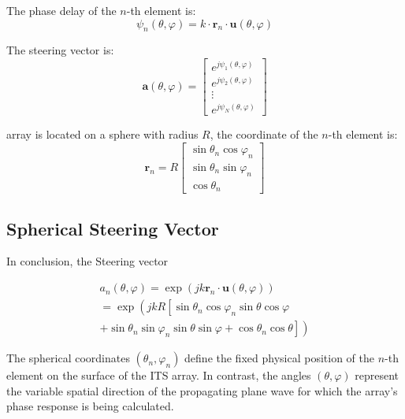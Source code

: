 \documentclass[journal,comsoc]{IEEEtran}
\begin{document}
	The phase delay of the $ n $-th element is:
	\begin{equation}
		\psi_n(\theta, \varphi) = k\cdot \mathbf{r}_n \cdot \mathbf{u}(\theta, \varphi)
	\end{equation}
	
	The steering vector is:
	\begin{equation}
		\mathbf{a}(\theta, \varphi) = \begin{bmatrix} 
			e^{j\psi_1(\theta, \varphi)} \\ 
			e^{j\psi_2(\theta, \varphi)} \\ 
			\vdots \\ 
			e^{j\psi_N(\theta, \varphi)} 
		\end{bmatrix}
	\end{equation}
	
	array is located on a sphere with radius $ R $, the coordinate of the $ n $-th element is:
	\begin{equation}
		\mathbf{r}_n = R \begin{bmatrix} 
			\sin\theta_n \cos\varphi_n \\ 
			\sin\theta_n \sin\varphi_n \\ 
			\cos\theta_n 
		\end{bmatrix}
	\end{equation}
	
	\subsection{Spherical Steering Vector }
	
	In conclusion, the Steering vector
	
	\begin{equation}  
		\begin{array}{l} 
		a_n(\theta, \varphi)=\exp (jk \mathbf{r}_n \cdot \mathbf{u}(\theta, \varphi))
		\\=\exp \left(j k R\left[\sin \theta_n \cos \varphi_n \sin \theta \cos \varphi\right.\right.\\+\left.\left.\sin \theta_n \sin \varphi_n \sin \theta \sin \varphi+\cos \theta_n \cos \theta\right  ]\right)
	    \end{array}
	\end{equation}
	
	
	The spherical coordinates $(\theta_n, \varphi_n)$ define the fixed physical position of the $n$-th element on the surface of the ITS array. In contrast, the angles $(\theta, \varphi)$ represent the variable spatial direction of the propagating plane wave for which the array's phase response is being calculated.
	
\end{document}
